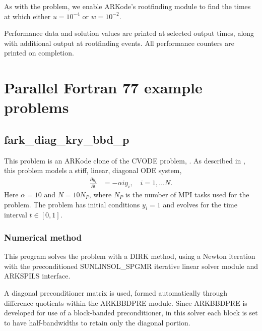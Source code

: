 \documentclass[letterpaper,10pt,english]{sphinxmanual}
\begin{document}
As with the {\hyperref[\detokenize{c_serial:ark-robertson-root}]{}} problem, we enable ARKode’s
rootfinding module to find the times at which either \(u=10^{-4}\)
or \(w=10^{-2}\).

Performance data and solution values are printed at
selected output times, along with additional output at rootfinding
events.  All performance counters are printed on completion.


\chapter{Parallel Fortran 77 example problems}
\label{\detokenize{f77_parallel::doc}}\label{\detokenize{f77_parallel:parallel-fortran-77-example-problems}}\label{\detokenize{f77_parallel:parallel-f77}}

\section{fark\_diag\_kry\_bbd\_p}
\label{\detokenize{f77_parallel:fark-diag-kry-bbd-p}}\label{\detokenize{f77_parallel:id1}}
This problem is an ARKode clone of the CVODE problem,
.  As described in \label{\detokenize{f77_parallel:id2}}{\hyperref[\detokenize{References:hsr2017}]{\sphinxcrossref{{[}HSR2017{]}}}}, this problem
models a stiff, linear, diagonal ODE system,
\begin{equation*}
\begin{split}\frac{\partial y_i}{\partial t} &= -\alpha i y_i, \quad i=1,\ldots N.\end{split}
\end{equation*}
Here \(\alpha=10\) and \(N=10 N_P\), where \(N_P\) is the
number of MPI tasks used for the problem.  The problem has initial
conditions \(y_i=1\) and evolves for the time interval \(t\in
[0,1]\).


\subsection{Numerical method}
\label{\detokenize{f77_parallel:numerical-method}}
This program solves the problem with a DIRK method, using a Newton
iteration with the preconditioned SUNLINSOL\_SPGMR iterative linear
solver module and ARKSPILS interface.

A diagonal preconditioner matrix is used, formed automatically through
difference quotients within the ARKBBDPRE module.  Since ARKBBDPRE is
developed for use of a block-banded preconditioner, in this solver
each block is set to have half-bandwidths  to
retain only the diagonal portion.
\end{document}

